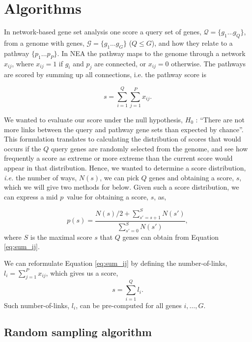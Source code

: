 \documentclass[a4paper,american]{lipics-v2016}
\begin{document}
\section*{Algorithms}

In network-based gene set analysis one score a query set of genes, $ \mathcal{Q}=\{g_1 \ldots g_Q\}$, from a genome with genes, $\mathcal{G}=\{g_1 \ldots g_G\}$ ($Q \le G$), and how they relate to a pathway $\{p_1 \ldots p_P\}$. In NEA the pathway maps to the genome through a network ${x_{ij}}$, where $x_{ij}=1$ if $g_i$ and $p_j$ are connected, or $x_{ij}=0$ otherwise. The pathways are scored by summing up all connections, i.e. the pathway score is

\begin{equation}
s=\sum_{i=1}^Q\sum_{j=1}^P x_{ij}.
\label{eq:sum_ij}
\end{equation}

We wanted to evaluate our score under the null hypothesis, $H_0$ : ``There are not more links between the query and pathway gene sets than expected by chance''. This  formulation translates to calculating the distribution of scores that would occurs if the $Q$ query genes are randomly selected from the genome, and see how frequently a score as extreme or more extreme than the current score would appear in that distribution. Hence, we wanted to determine a score distribution, {\em i.e.} the number of ways, $N(s)$, we can pick $Q$ genes and obtaining a score, $s$, which we will give two methods for below. Given such a score distribution, we can express a mid $p$~value\cite{lancaster1961significance,hwang2001optimality} for obtaining a score, $s$, as,

\begin{equation}
p(s)=\frac{N(s)/2 +\sum_{s'=s+1}^{S} N(s')}{\sum_{s'=0}^{S} N(s')},
\label{eq:pval}
\end{equation}
where $S$ is the maximal score $s$ that $Q$ genes can obtain from Equation \ref{eq:sum_ij}.

We can reformulate Equation \ref{eq:sum_ij} by defining the number-of-links, $l_i=\sum_{j=1}^P x_{ij}$, which gives us a score,
\begin{equation}
s=\sum_{i=1}^Q l_i.
\label{eq:sum_i}
\end{equation}
Such number-of-links, $l_i$, can be pre-computed for all genes $i, \ldots, G$.

\subsection*{Random sampling algorithm}
\end{document}
